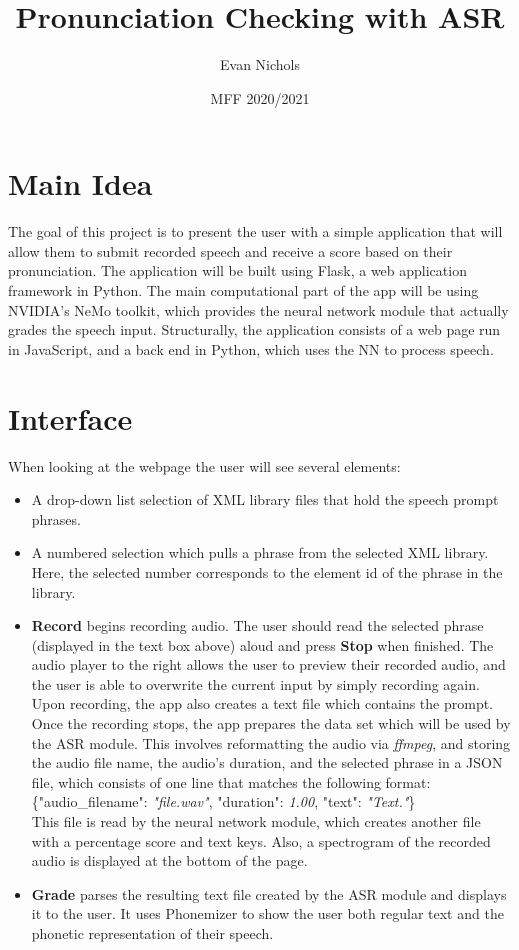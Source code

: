 \documentclass[12pt, letterpaper]{article}
\title{Pronunciation Checking with ASR}
\author{Evan Nichols}
\date{MFF 2020/2021}
\begin{document}
\maketitle

\section*{Main Idea}
The goal of this project is to present the user with a simple application that will allow them to submit recorded speech and receive a score based on their pronunciation. The application will be built using Flask, a web application framework in Python. The main computational part of the app will be using NVIDIA's NeMo toolkit, which provides the neural network module that actually grades the speech input. Structurally, the application consists of a web page run in JavaScript, and a back end in Python, which uses the NN to process speech. 

\section*{Interface}
When looking at the webpage the user will see several elements:
\begin{itemize}
\item A drop-down list selection of XML library files that hold the speech prompt phrases.

\item A numbered selection which pulls a phrase from the selected XML library. Here, the selected number corresponds to the element id of the phrase in the library.

\item \textbf{Record} begins recording audio. The user should read the selected phrase (displayed in the text box above) aloud and press \textbf{Stop} when finished. The audio player to the right allows the user to preview their recorded audio, and the user is able to overwrite the current input by simply recording again. Upon recording, the app also creates a text file which contains the prompt. Once the recording stops, the app prepares the data set which will be used by the ASR module. This involves reformatting the audio via \textit{ffmpeg}, and storing the audio file name, the audio's duration, and the selected phrase in a JSON file, which consists of one line that matches the following format: \\
\hspace*{19mm} \{"audio\_filename": \textit{"file.wav"}, "duration": \textit{1.00}, "text": \textit{"Text."}\} \\
This file is read by the neural network module, which creates another file with a percentage score and text keys. Also, a spectrogram of the recorded audio is displayed at the bottom of the page.

\item \textbf{Grade} parses the resulting text file created by the ASR module and displays it to the user. It uses Phonemizer to show the user both regular text and the phonetic representation of their speech.
\end{itemize}
\newpage%
\end{document}
